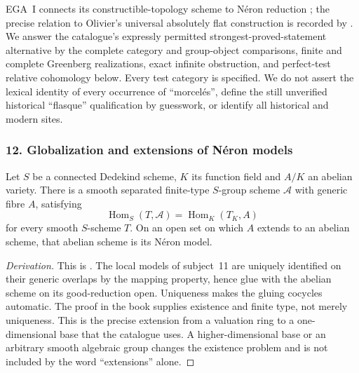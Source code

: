 EGA~I connects its constructible-topology scheme to N\'eron reduction
\cite[I, 7.2.14, pp.~338--339]{ROOT_EGAI1971}; the precise relation to
Olivier's universal absolutely flat construction is recorded by
\cite[8.3, p.~581]{ROOT_Ferrand2003}.
We answer the catalogue's expressly permitted strongest-proved-statement
alternative by the complete category and group-object comparisons,
finite and complete Greenberg realizations, exact infinite obstruction,
and perfect-test relative cohomology below. Every test category is
specified. We do not assert the lexical identity of every occurrence of
``morcel\'es'', define the still unverified historical ``flasque''
qualification by guesswork, or identify all historical and modern sites.








\subsubsection{12. Globalization and extensions of N\'eron models}
\begin{theorem}\label{B:subject12}
Let $S$ be a connected Dedekind scheme, $K$ its function field and $A/K$ an abelian variety. There is a smooth separated finite-type $S$-group scheme $\mathcal A$ with generic fibre $A$, satisfying
\[
 \operatorname{Hom}_S(T,\mathcal A)=\operatorname{Hom}_K(T_K,A)
\]
for every smooth $S$-scheme $T$. On an open set on which $A$ extends to an abelian scheme, that abelian scheme is its N\'eron model.
\end{theorem}
\begin{proof}[Derivation]
This is \cite[\S1.4, Theorem 3]{BBLR1990}. The local models of subject~11 are uniquely identified on their generic overlaps by the mapping property, hence glue with the abelian scheme on its good-reduction open. Uniqueness makes the gluing cocycles automatic. The proof in the book supplies existence and finite type, not merely uniqueness. This is the precise extension from a valuation ring to a one-dimensional base that the catalogue uses. A higher-dimensional base or an arbitrary smooth algebraic group changes the existence problem and is not included by the word ``extensions'' alone.
\end{proof}

